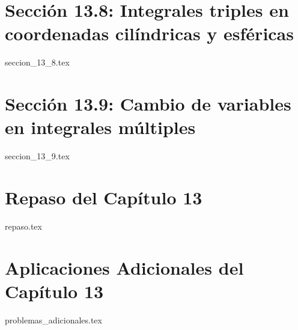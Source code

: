 \section*{Sección 13.8: Integrales triples en coordenadas cilíndricas y esféricas}
{seccion_13_8.tex}

\section*{Sección 13.9: Cambio de variables en integrales múltiples}
{seccion_13_9.tex}

\section*{Repaso del Capítulo 13}
{repaso.tex}

\section*{Aplicaciones Adicionales del Capítulo 13}
{problemas_adicionales.tex}
